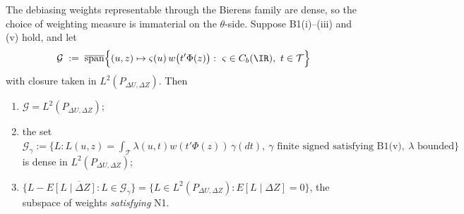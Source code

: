 \begin{lemma}\label{lem:density}
The debiasing weights representable through the Bierens family are dense, so the choice of weighting
measure is immaterial on the $\theta$-side.
Suppose B1(i)--(iii) and (v) hold, and let
\[
\mathcal G\;:=\;\overline{\operatorname{span}}\Big\{(u,z)\mapsto\varsigma(u)\,w\big(t'\Phi(z)\big):\ \varsigma\in C_b(\IR),\ t\in\mathcal T\Big\}
\]
with closure taken in $L^{2}(P_{\Delta U,\Delta Z})$. Then
\begin{enumerate}
\item[(i)] $\mathcal G=L^{2}(P_{\Delta U,\Delta Z})$;
\item[(ii)] the set
$\mathcal G_\gamma:=\big\{L:L(u,z)=\int_{\mathcal T}\lambda(u,t)w(t'\Phi(z))\,\gamma(dt),\ \gamma\text{ finite signed satisfying B1(v)},\ \lambda\text{ bounded}\big\}$
is dense in $L^{2}(P_{\Delta U,\Delta Z})$;
\item[(iii)] $\overline{\{L-E[L\mid\Delta Z]:L\in\mathcal G_\gamma\}}
=\{L\in L^{2}(P_{\Delta U,\Delta Z}):E[L\mid\Delta Z]=0\}$, the subspace of weights \emph{satisfying}
N1.
\end{enumerate}
\end{lemma}

